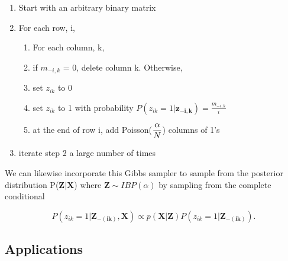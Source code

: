 \begin{enumerate}
  \item Start with an arbitrary binary matrix
  \item For each row, i,
  \begin{enumerate}
    \item For each column, k,
    \item if $m_{-i,k}$ = 0, delete column k. Otherwise,
    \item set $z_{ik}$ to 0
    \item set $z_{ik}$ to 1 with probability $P(z_{ik}=1|\bm{z_{-i,k}}) = \frac{m_{-i,k}}{i}$
    \item at the end of row i, add Poisson($\displaystyle\frac{\alpha}{N}$) columns of 1's
  \end{enumerate}
  \item iterate step 2 a large number of times
\end{enumerate}
We can likewise incorporate this Gibbs sampler to sample from the posterior distribution P($\bm{Z|X}$)
where $\bm Z \sim IBP(\alpha)$ by sampling from the complete conditional

\begin{equation}
  P(z_{ik}=1|\bm{Z_{-(ik)},X})  \propto p(\bm{X|Z}) P(z_{ik}=1|\bm{Z_{-(ik)}}).
\end{equation}






\subsection{Applications}


